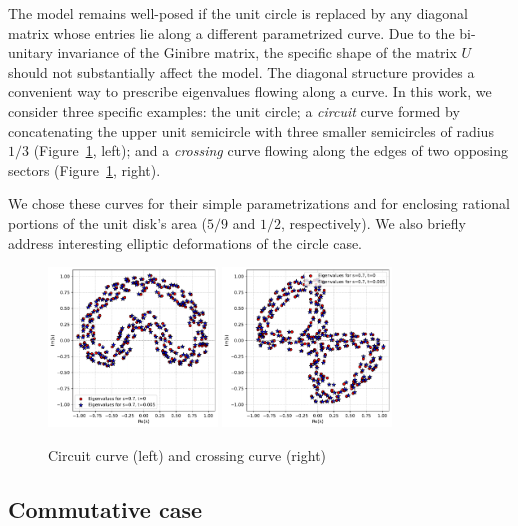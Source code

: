 \documentclass{article}
\begin{document}
	The model remains well-posed if the unit circle is replaced
	by any diagonal matrix whose entries lie along a different parametrized curve. 
	Due to the bi-unitary invariance of the Ginibre matrix, 
	the specific shape of the matrix $U$ should not substantially affect the model.
	The diagonal structure provides a convenient way to prescribe eigenvalues 
	flowing along a curve. 
	In this work, we consider three specific examples: 
	the unit circle; 
	a \emph{circuit} curve formed by concatenating the upper unit semicircle with three smaller semicircles 
	of radius $1/3$ (Figure~\ref{fig:curves}, left); 
	and a \emph{crossing} curve flowing along the edges of two opposing sectors (Figure~\ref{fig:curves}, right).

	We chose these curves for their simple parametrizations 
	and for enclosing rational portions of the unit disk's area ($5/9$ and $1/2$, respectively). 
	We also briefly address interesting elliptic deformations of the circle case.

	\begin{figure}[htbp]
		\centering
		\includegraphics[width=0.4\textwidth]{figures/intro_circuit.pdf}
		\includegraphics[width=0.4\textwidth]{figures/intro_crossing.pdf}
			   \caption{Circuit curve (left) and crossing curve (right)}
		\label{fig:curves}
	\end{figure}

	\subsection{Commutative case} \label{subsection:commutative-case}
\end{document}
